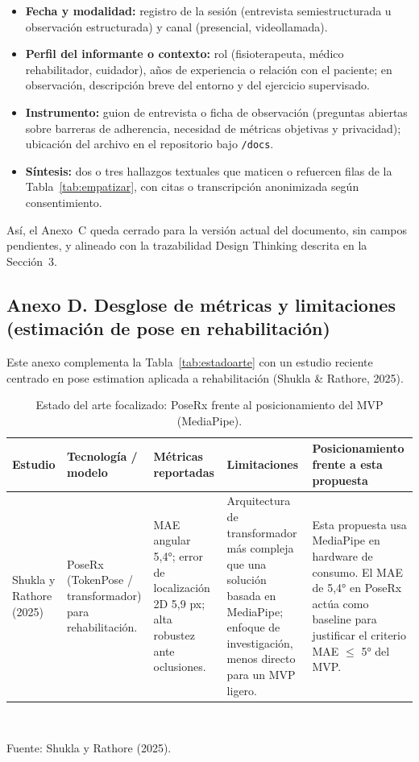 \documentclass[11pt,a4paper]{article}
\renewcommand{\arraystretch}{1.35}
\begin{document}
\begin{itemize}
  \item \textbf{Fecha y modalidad:} registro de la sesión (entrevista semiestructurada u observación estructurada) y canal (presencial, videollamada).
  \item \textbf{Perfil del informante o contexto:} rol (fisioterapeuta, médico rehabilitador, cuidador), años de experiencia o relación con el paciente; en observación, descripción breve del entorno y del ejercicio supervisado.
  \item \textbf{Instrumento:} guion de entrevista o ficha de observación (preguntas abiertas sobre barreras de adherencia, necesidad de métricas objetivas y privacidad); ubicación del archivo en el repositorio bajo \texttt{/docs}.
  \item \textbf{Síntesis:} dos o tres hallazgos textuales que maticen o refuercen filas de la Tabla~\ref{tab:empatizar}, con citas o transcripción anonimizada según consentimiento.
\end{itemize}

Así, el Anexo~C queda cerrado para la versión actual del documento, sin campos pendientes, y alineado con la trazabilidad Design Thinking descrita en la Sección~3.

\subsection*{Anexo D. Desglose de métricas y limitaciones (estimación de pose en rehabilitación)}
\label{anexo:estado-arte}
Este anexo complementa la Tabla~\ref{tab:estadoarte} con un estudio reciente centrado en pose estimation aplicada a rehabilitación (Shukla \& Rathore, 2025).

\begin{table}[htbp]
\caption{Estado del arte focalizado: PoseRx frente al posicionamiento del MVP (MediaPipe).}
\label{tab:anexo-pose}
\footnotesize
\centering
\renewcommand{\arraystretch}{1.25}
\begin{tabular}{@{}p{2.1cm}p{2.35cm}p{2.5cm}p{2.35cm}p{2.55cm}@{}}
\toprule
Estudio & Tecnología / modelo & Métricas reportadas & Limitaciones & Posicionamiento frente a esta propuesta \\
\midrule
Shukla y Rathore (2025) & PoseRx (TokenPose / transformador) para rehabilitación. & MAE angular 5,4°; error de localización 2D 5,9 px; alta robustez ante oclusiones. & Arquitectura de transformador más compleja que una solución basada en MediaPipe; enfoque de investigación, menos directo para un MVP ligero. & Esta propuesta usa MediaPipe en hardware de consumo. El MAE de 5,4° en PoseRx actúa como baseline para justificar el criterio MAE $\leq$ 5° del MVP. \\
\bottomrule
\end{tabular}\\
\renewcommand{\arraystretch}{1.35}
\vspace{4pt}
\raggedright\footnotesize Fuente: Shukla y Rathore (2025).
\end{table}
\vspace{0.5em}
\end{document}
